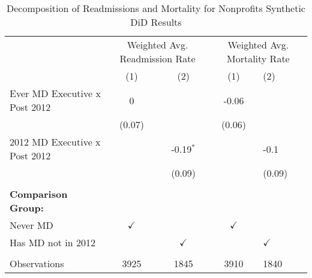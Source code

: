 \begin{table}[ht!]

\caption{\label{tab:MD_noMD_readmort_decomp_synth}Decomposition of Readmissions and Mortality for Nonprofits Synthetic DiD Results}
\centering
\begin{tabular}[t]{lcccl}
\toprule
\multicolumn{1}{c}{ } & \multicolumn{2}{c}{Weighted Avg. Readmission Rate} & \multicolumn{2}{c}{Weighted Avg. Mortality Rate} \\
\cmidrule(l{3pt}r{3pt}){2-3} \cmidrule(l{3pt}r{3pt}){4-5}
 & (1) & (2) & (1) & (2)\\
\midrule
Ever MD Executive x Post 2012 & 0 &  & -0.06 & \\
 & (0.07) &  & (0.06) & \\
2012 MD Executive x Post 2012 &  & -0.19$^{*}$ &  & -0.1\\
 &  & (0.09) &  & (0.09)\\
 &  &  & & \\
\addlinespace
\textbf{Comparison Group:} &  &  &  & \\
Never MD & $\checkmark$ &  & $\checkmark$ & \\
Has MD not in 2012 &  & $\checkmark$ &  & $\checkmark$\\
 &  &  &  & \\
Observations & 3925 & 1845 & 3910 & 1840\\
\bottomrule
\end{tabular}
\end{table}
